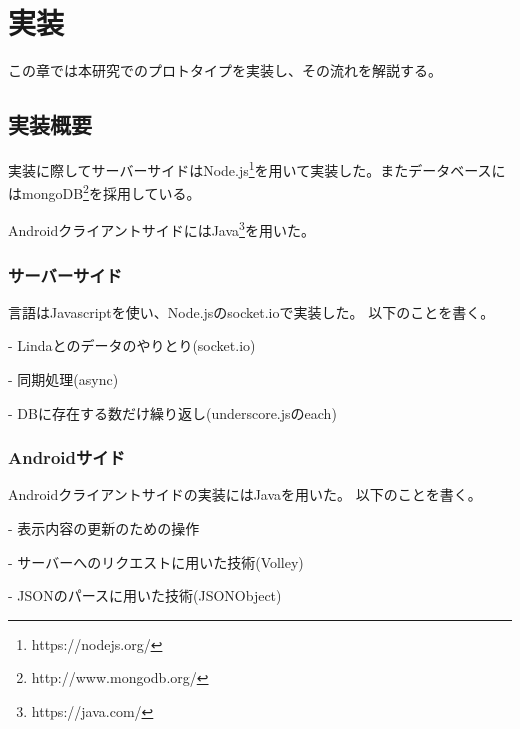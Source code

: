 \chapter{実装}
\label{chap:prototype}

この章では本研究でのプロトタイプを実装し、その流れを解説する。

\section{実装概要}
実装に際してサーバーサイドはNode.js\footnote{https://nodejs.org/}を用いて実装した。またデータベースにはmongoDB\footnote{http://www.mongodb.org/}を採用している。

AndroidクライアントサイドにはJava\footnote{https://java.com/}を用いた。

\subsection{サーバーサイド}
言語はJavascriptを使い、Node.jsのsocket.ioで実装した。
以下のことを書く。

- Lindaとのデータのやりとり(socket.io)

- 同期処理(async)

- DBに存在する数だけ繰り返し(underscore.jsのeach)

\subsection{Androidサイド}
Androidクライアントサイドの実装にはJavaを用いた。
以下のことを書く。

- 表示内容の更新のための操作

- サーバーへのリクエストに用いた技術(Volley)

- JSONのパースに用いた技術(JSONObject)
